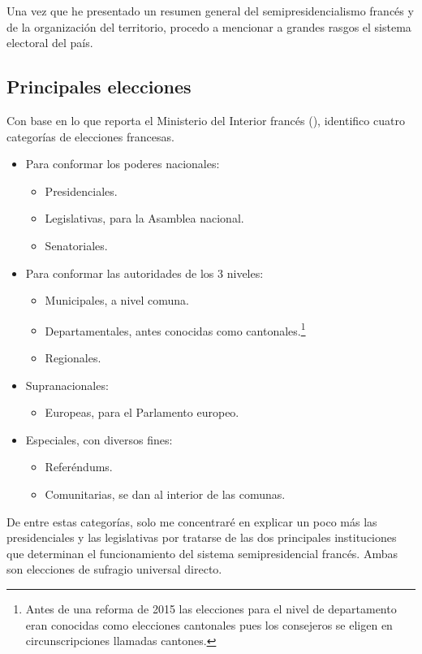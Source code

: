 Una vez que he presentado un resumen general del semipresidencialismo francés y de la organización del territorio, procedo a mencionar a grandes rasgos el sistema electoral del país.

\subsection{Principales elecciones}

Con base en lo que reporta el Ministerio del Interior francés (), identifico cuatro categorías de elecciones francesas. 

\begin{itemize}
\item Para conformar los poderes nacionales: 
	\begin{itemize}
	\item Presidenciales. 
	\item Legislativas, para la Asamblea nacional.
	\item Senatoriales.
	\end{itemize}
	
\item Para conformar las autoridades de los 3 niveles: 
	\begin{itemize}
	\item Municipales, a nivel comuna. 
	\item Departamentales, antes conocidas como cantonales.\footnote{Antes de una reforma de 2015 las elecciones para el nivel de departamento eran conocidas como elecciones cantonales pues los consejeros se eligen en circunscripciones llamadas cantones.}
	\item Regionales.
	\end{itemize}
	
\item Supranacionales:
	\begin{itemize}
	\item Europeas, para el Parlamento europeo.
	\end{itemize}
	
\item Especiales, con diversos fines: 
	\begin{itemize}
	\item Referéndums.
	\item Comunitarias, se dan al interior de las comunas.
	\end{itemize}
\end{itemize}

De entre estas categorías, solo me concentraré en explicar un poco más las presidenciales y las legislativas por tratarse de las dos principales instituciones que determinan el funcionamiento del sistema semipresidencial francés. Ambas son elecciones de sufragio universal directo.\\

